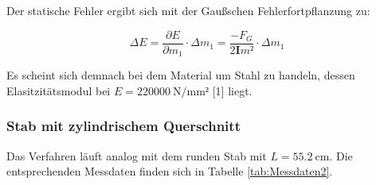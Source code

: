 Der statische Fehler ergibt sich mit der Gaußschen Fehlerfortpflanzung zu: 

\begin{equation*}
\Delta E = \frac{\partial E}{\partial m_1}\cdot \Delta m_1 
= \frac{-F_G}{2\symbf{I}m²} \cdot \Delta m_1
\end{equation*}

Es scheint sich demnach bei dem Material um Stahl zu handeln, dessen 
Elasitzitätsmodul bei $E=\SI{220000}{\newton\per\milli\meter²}$ [1] liegt.

\subsubsection{Stab mit zylindrischem Querschnitt}

Das Verfahren läuft analog mit dem runden Stab mit $L = \SI{55.2}{\centi\meter}$.
Die entsprechenden Messdaten finden sich in Tabelle \ref{tab:Messdaten2}. 

